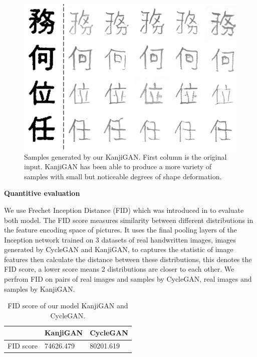 \documentclass[12pt]{report}
\begin{document}
\begin{figure}[h]
	\centering
	\includegraphics[scale=0.8]{kanji-gan-results-2}
	\caption{Samples generated by our KanjiGAN. First column is the original input. KanjiGAN has been able to produce a more variety of samples with small but noticeable degrees of shape deformation.}
	\label{fig:kanji-gan-results-2}
\end{figure}

\textbf{Quantitive evaluation}

We use Frechet Inception Distance (FID) which was introduced in \cite{fid} to evaluate both model. The FID score measures similarity between different distributions in the feature encoding space of pictures. It uses the final pooling layers of the Inception network trained on 3 datasets of real handwritten images, images generated by CycleGAN and KanjiGAN, to captures the statistic of image features then calculate the distance between these distributions, this denotes the FID score, a lower score means 2 distributions are closer to each other. We perfrom FID on pairs of real images and samples by CycleGAN, real images and samples by KanjiGAN.

\begin{table}[h]
	\centering
	\caption{FID score of our model KanjiGAN and CycleGAN.}
	\label{tbl:fid}
	\begin{tabular}{|l|l|l|}
		\hline
		\textbf{} & \textbf{KanjiGAN} & \textbf{CycleGAN}                                        \\ \hline
		FID score	&74626.479               & 80201.619                                            \\ \hline
	\end{tabular}
\end{table}
\end{document}
